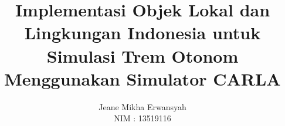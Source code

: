 \documentclass[bahasa, 12pt, a4paper, onecolumn, oneside, final]{report}
\begin{document}
\newcommand{\thedate}{\date{23 Juni 2023}}
\newcommand{\monthyear}{JUNI 2023}

\newcommand{\capstonetitle}{Pengembangan Sistem Simulasi \textit{Autonomous Tram} dengan Simulator CARLA}
\newcommand{\thetitle}{Implementasi Objek Lokal dan Lingkungan Indonesia untuk Simulasi
Trem Otonom Menggunakan Simulator CARLA}

\title{\thetitle}

\newcommand{\subtitle}{
    \bfseries \Large
    Laporan Tugas Akhir - Capstone

    \capstonetitle
}

\newcommand{\authorname}{Jeane Mikha Erwansyah}
\newcommand{\authornim}{13519116}
\author{
    \authorname \\
    NIM : \authornim
}


\newcommand{\advisoronename}{Achmad Imam Kistijantoro, Ph.D.}
\newcommand{\advisoronenip}{197308092006041001}
\newcommand{\advisortwoname}{Prof. Dr. Bambang Riyanto Trilaksono}
\newcommand{\advisortwonip}{196211151987031004}
\newcommand{\advisorapproval}{
    \centering
    \normalsize \normalfont

    \vspace{0.5cm}
    \setlength{\tabcolsep}{12pt}
    \begin{tabular}{c@{\hskip 0.5cm}c}
        Pembimbing I,               & Pembimbing II,             \\
                                    &                            \\
                                    &                            \\
                                    &                            \\
                                    &                            \\
        \underline{\advisoronename} & \underline{\advisortwoname} \\
        NIP. \advisoronenip     & NIP. \advisortwonip     \\
    \end{tabular}
    }
\end{document}
